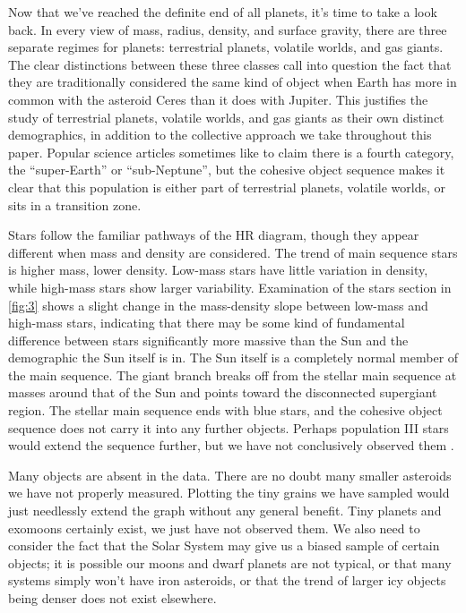 \documentclass[twocolumn,linenumbers]{aastex631}
\begin{document}
Now that we've reached the definite end of all planets, it's time to take a look back. In every view of mass, radius, density, and surface gravity, there are three separate regimes for planets: terrestrial planets, volatile worlds, and gas giants. The clear distinctions between these three classes call into question the fact that they are traditionally considered the same kind of object when Earth has more in common with the asteroid Ceres than it does with Jupiter. This justifies the study of terrestrial planets, volatile worlds, and gas giants as their own distinct demographics, in addition to the collective approach we take throughout this paper. Popular science articles sometimes like to claim there is a fourth category, the ``super-Earth'' or ``sub-Neptune'', but the cohesive object sequence makes it clear that this population is either part of terrestrial planets, volatile worlds, or sits in a transition zone.

Stars follow the familiar pathways of the HR diagram, though they appear different when mass and density are considered. The trend of main sequence stars is higher mass, lower density. Low-mass stars have little variation in density, while high-mass stars show larger variability. Examination of the stars section in \ref{fig:3} shows a slight change in the mass-density slope between low-mass and high-mass stars, indicating that there may be some kind of fundamental difference between stars significantly more massive than the Sun and the demographic the Sun itself is in. The Sun itself is a completely normal member of the main sequence. The giant branch breaks off from the stellar main sequence at masses around that of the Sun and points toward the disconnected supergiant region. The stellar main sequence ends with blue stars, and the cohesive object sequence does not carry it into any further objects. Perhaps population III stars would extend the sequence further, but we have not conclusively observed them \citep{Larkin2022}.

Many objects are absent in the data. There are no doubt many smaller asteroids we have not properly measured. Plotting the tiny grains we have sampled would just needlessly extend the graph without any general benefit. Tiny planets and exomoons certainly exist, we just have not observed them. We also need to consider the fact that the Solar System may give us a biased sample of certain objects; it is possible our moons and dwarf planets are not typical, or that many systems simply won't have iron asteroids, or that the trend of larger icy objects being denser does not exist elsewhere. 
\end{document}
